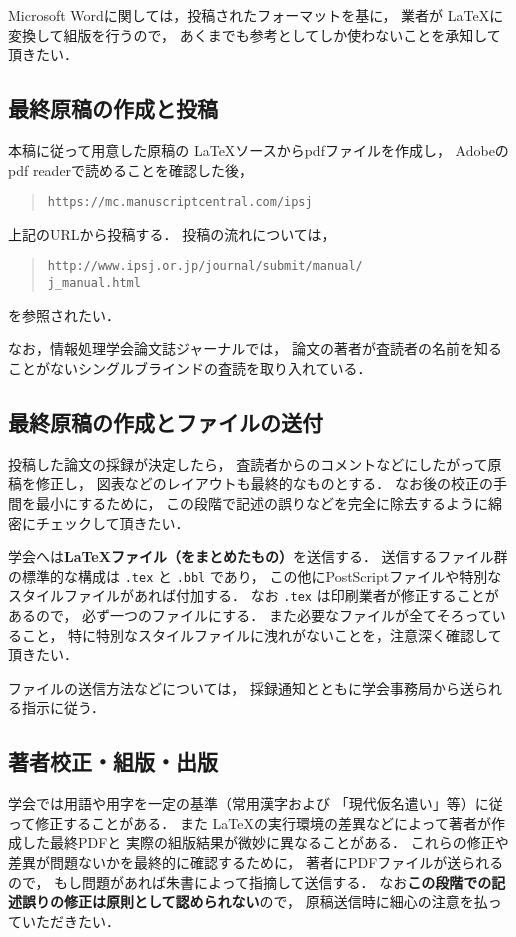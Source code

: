\documentclass[submit]{ipsj}
\def\|{\verb|}
\begin{document}
Microsoft Wordに関しては，投稿されたフォーマットを基に， 業者が \LaTeX に変換して組版を行うので， あくまでも参考としてしか使わないことを承知して頂きたい．

%2.2
\subsection{最終原稿の作成と投稿}

本稿に従って用意した原稿の \LaTeX ソースからpdfファイルを作成し，
Adobeのpdf readerで読めることを確認した後，
\begin{quote}
	\small
	\|https://mc.manuscriptcentral.com/ipsj|
\end{quote}
上記のURLから投稿する．
投稿の流れについては，
\begin{quote}
	\small
	\|http://www.ipsj.or.jp/journal/submit/manual/|\\
	\|j_manual.html|
\end{quote}
を参照されたい．

なお，情報処理学会論文誌ジャーナルでは，
論文の著者が査読者の名前を知ることがないシングルブラインドの査読を取り入れている．

\subsection{最終原稿の作成とファイルの送付}

投稿した論文の採録が決定したら，
査読者からのコメントなどにしたがって原稿を修正し，
図表などのレイアウトも最終的なものとする．
なお後の校正の手間を最小にするために，
この段階で記述の誤りなどを完全に除去するように綿密にチェックして頂きたい．

学会へは{\bf \LaTeX ファイル（をまとめたもの）}を送信する．
送信するファイル群の標準的な構成は \|.tex| と \|.bbl| であり，
この他にPostScriptファイルや特別なスタイルファイルがあれば付加する．
なお \|.tex| は印刷業者が修正することがあるので，
{必ず一つのファイルにする}．
また必要なファイルが全てそろっていること，
特に特別なスタイルファイルに洩れがないことを，注意深く確認して頂きたい．

ファイルの送信方法などについては，
採録通知とともに学会事務局から送られる指示に従う．

\subsection{著者校正・組版・出版}

学会では用語や用字を一定の基準（常用漢字および
「現代仮名遣い」等）に従って修正することがある．
また \LaTeX の実行環境の差異などによって著者が作成した最終PDFと
実際の組版結果が微妙に異なることがある．
これらの修正や差異が問題ないかを最終的に確認するために，
著者にPDFファイルが送られるので，
もし問題があれば朱書によって指摘して送信する．
なお{\bf この段階での記述誤りの修正は原則として認められない}ので，
原稿送信時に細心の注意を払っていただきたい．
\end{document}
